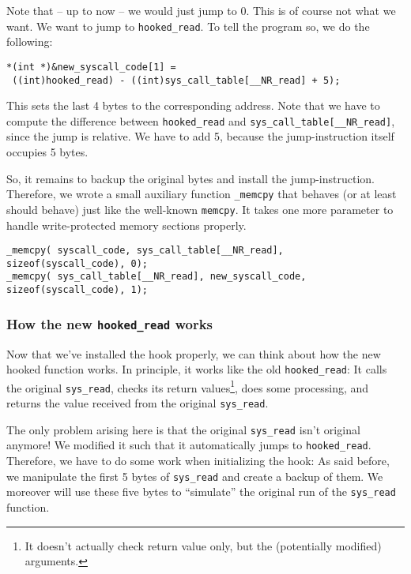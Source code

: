 \documentclass[10pt, letterpaper]{article}
\begin{document}
Note that -- up to now -- we would just jump to 0. This is of course not what we want. We want to jump to \texttt{hooked\_read}. To tell the program so, we do the following:

\begin{verbatim}
*(int *)&new_syscall_code[1] = 
 ((int)hooked_read) - ((int)sys_call_table[__NR_read] + 5);
\end{verbatim}

This sets the last 4 bytes to the corresponding address. Note that we have to compute the difference between \texttt{hooked\_read} and \texttt{sys\_call\_table[\_\_NR\_read]}, since the jump is relative. We have to add 5, because the jump-instruction itself occupies 5 bytes.

So, it remains to backup the original bytes and install the jump-instruction. Therefore, we wrote a small auxiliary function \texttt{\_memcpy} that behaves (or at least should behave) just like the well-known \texttt{memcpy}. It takes one more parameter to handle write-protected memory sections properly.

\begin{verbatim}
_memcpy( syscall_code, sys_call_table[__NR_read], sizeof(syscall_code), 0);
_memcpy( sys_call_table[__NR_read], new_syscall_code, sizeof(syscall_code), 1);
\end{verbatim}

\subsubsection{How the new \texttt{hooked\_read} works}
\label{sec:hooked-read-2-technique}

Now that we've installed the hook properly, we can think about how the new hooked function works. In principle, it works like the old \texttt{hooked\_read}: It calls the original \texttt{sys\_read}, checks its return values\footnote{It doesn't actually check return value only, but the (potentially modified) arguments.}, does some processing, and returns the value received from the original \texttt{sys\_read}.

The only problem arising here is that the original \texttt{sys\_read} isn't original anymore! We modified it such that it automatically jumps to \texttt{hooked\_read}. Therefore, we have to do some work when initializing the hook: As said before, we manipulate the first 5 bytes of \texttt{sys\_read} and create a backup of them. We moreover will use these five bytes to ``simulate'' the original run of the \texttt{sys\_read} function.
\end{document}
